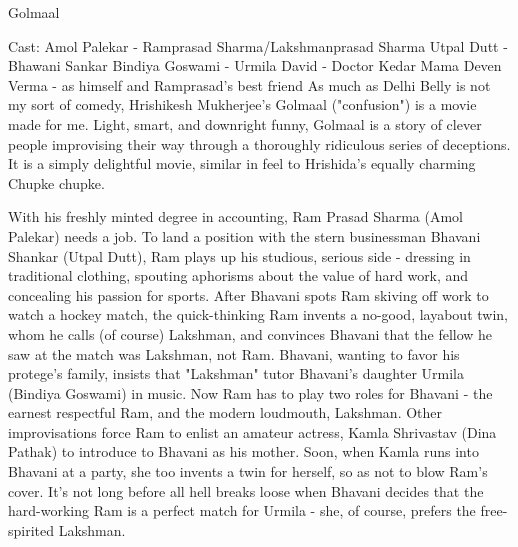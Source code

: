 \documentclass{article}
\begin{document}
\Large{Golmaal}

Cast:\newline
    Amol Palekar - Ramprasad Sharma/Lakshmanprasad Sharma\newline
    Utpal Dutt - Bhawani Sankar\newline
    Bindiya Goswami - Urmila\newline
    David - Doctor Kedar Mama\newline
    Deven Verma - as himself and Ramprasad's best friend\newline
\newline
As much as Delhi Belly is not my sort of comedy, Hrishikesh Mukherjee's Golmaal ("confusion") is a movie made for me.  Light, smart, and downright funny, Golmaal is a story of clever people improvising their way through a thoroughly ridiculous series of deceptions.  It is a simply delightful movie, similar in feel to Hrishida's equally charming Chupke chupke. 

With his freshly minted degree in accounting, Ram Prasad Sharma (Amol Palekar) needs a job.  To land a position with the stern businessman Bhavani Shankar (Utpal Dutt), Ram plays up his studious, serious side - dressing in traditional clothing, spouting aphorisms about the value of hard work, and concealing his passion for sports.  After Bhavani spots Ram skiving off work to watch a hockey match, the quick-thinking Ram invents a no-good, layabout twin, whom he calls (of course) Lakshman, and convinces Bhavani that the fellow he saw at the match was Lakshman, not Ram.  Bhavani, wanting to favor his protege's family, insists that "Lakshman" tutor Bhavani's daughter Urmila (Bindiya Goswami) in music.  Now Ram has to play two roles for Bhavani - the earnest respectful Ram, and the modern loudmouth, Lakshman.  Other improvisations force Ram to enlist an amateur actress, Kamla Shrivastav (Dina Pathak) to introduce to Bhavani as his mother.  Soon, when Kamla runs into Bhavani at a party, she too invents a twin for herself, so as not to blow Ram's cover.  It's not long before all hell breaks loose when Bhavani decides that the hard-working Ram is a perfect match for Urmila - she, of course, prefers the free-spirited Lakshman.
\end{document}
